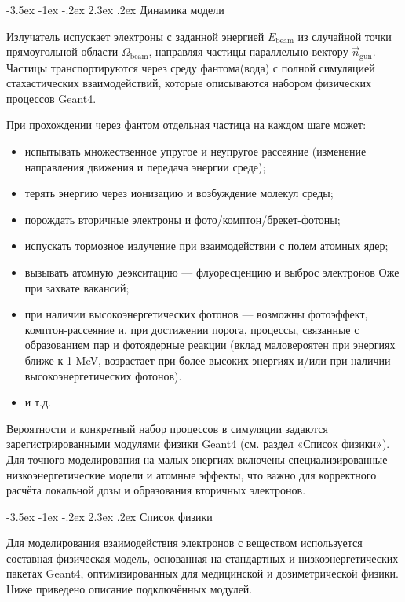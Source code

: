 \documentclass[a4paper,12pt]{article} %
\makeatletter
\renewcommand{\section}{%
  \@startsection{section}{1}{\z@}%
  {-3.5ex \@plus -1ex \@minus -.2ex}%
  {2.3ex \@plus.2ex}%
  {\normalfont\Large\bfseries}%
}
\makeatother
\begin{document}
\section{Динамика модели}

Излучатель испускает электроны с заданной энергией $E_{\text{beam}}$ из случайной точки прямоугольной области $\Omega_{\text{beam}}$, направляя частицы параллельно вектору $\vec n_{\text{gun}}$. Частицы транспортируются через среду фантома(вода) с полной симуляцией стахастических взаимодействий, которые описываются набором физических процессов Geant4.

При прохождении через фантом отдельная частица на каждом шаге может:
\begin{itemize}
  \item испытывать множественное упругое и неупругое рассеяние (изменение направления движения и передача энергии среде);
  \item терять энергию через ионизацию и возбуждение молекул среды;
  \item порождать вторичные электроны и фото/комптон/брекет-фотоны;
  \item испускать тормозное излучение при взаимодействии с полем атомных ядер;
  \item вызывать атомную деэкситацию — флуоресценцию и выброс электронов Оже при захвате вакансий;
  \item при наличии высокоэнергетических фотонов — возможны фотоэффект, комптон-рассеяние и, при достижении порога, процессы, связанные с образованием пар и фотоядерные реакции (вклад маловероятен при энергиях ближе к 1 MeV, возрастает при более высоких энергиях и/или при наличии высокоэнергетических фотонов).
  \item и т.д.
\end{itemize}

Вероятности и конкретный набор процессов в симуляции задаются зарегистрированными модулями физики Geant4 (см. раздел «Список физики»). Для точного моделирования на малых энергиях включены специализированные низкоэнергетические модели и атомные эффекты, что важно для корректного расчёта локальной дозы и образования вторичных электронов.

\section{Список физики}

Для моделирования взаимодействия электронов с веществом используется составная физическая модель, основанная на стандартных и низкоэнергетических пакетах Geant4, оптимизированных для медицинской и дозиметрической физики. Ниже приведено описание подключённых модулей.
\end{document}
